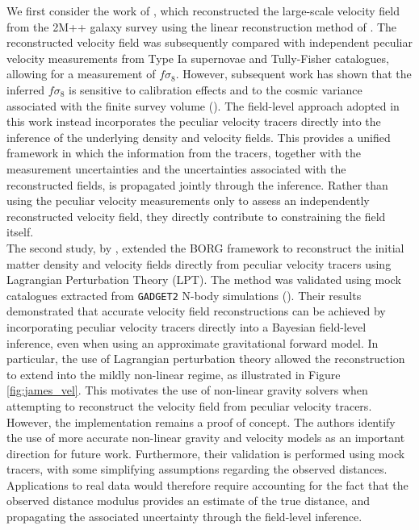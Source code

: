 We first consider the work of \cite{Boruah_2020}, which reconstructed the large-scale velocity field from the 2M++ galaxy survey \cite{Lavaux_2011} using the linear 
reconstruction method of \cite{Carrick_2015}. The reconstructed velocity field was subsequently compared with independent peculiar velocity measurements 
from Type Ia supernovae and Tully-Fisher catalogues, allowing for a measurement of $f\sigma_8$. 
However, subsequent work has shown that the inferred $f\sigma_8$ is sensitive to calibration effects and to the cosmic variance associated 
with the finite survey volume (\cite{Hollinger_2024}). 
The field-level approach adopted in this work instead incorporates the peculiar velocity tracers directly into the inference of the underlying density and velocity fields. 
This provides a unified framework in which the information from the tracers, together with the measurement uncertainties and the 
uncertainties associated with the reconstructed fields, is propagated jointly through the inference. 
Rather than using the peculiar velocity measurements only to assess an independently reconstructed velocity field, they directly contribute to constraining the field itself. \\


The second study, by \cite{Prideaux_Ghee_2022}, extended the BORG framework to reconstruct the initial matter density and velocity fields directly from peculiar velocity tracers 
using Lagrangian Perturbation Theory (LPT). 
The method was validated using mock catalogues extracted from \texttt{GADGET2} N-body simulations (\cite{Springel_2005}). 
Their results demonstrated that accurate velocity field reconstructions can be achieved by incorporating peculiar velocity tracers directly into a Bayesian field-level 
inference, even when using an approximate gravitational forward model. 
In particular, the use of Lagrangian perturbation theory allowed the reconstruction to extend into the mildly non-linear regime, as illustrated in Figure \ref{fig:james_vel}.
This motivates the use of non-linear 
gravity solvers when attempting to reconstruct the velocity field from 
peculiar velocity tracers.  
However, the implementation remains a proof of concept. 
The authors identify the use of more accurate non-linear gravity and velocity models as an important direction for future work. 
Furthermore, their validation is performed using mock tracers, with some 
simplifying assumptions regarding the observed distances. 
Applications to real data would therefore require accounting for the fact 
that the observed distance modulus provides an estimate of the true distance, 
and propagating the associated uncertainty through the field-level inference. \\

